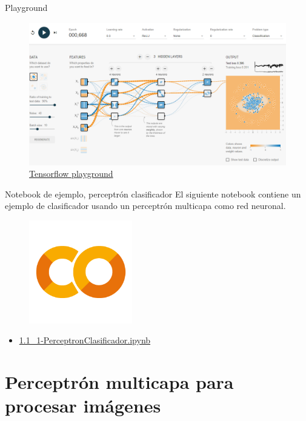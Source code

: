 \begin{frame}{Playground}
\begin{figure}
    \centering
    \includegraphics[width=\textwidth]{Slides/figures/Tema 3/Playground.png}
    \caption{\href{https://playground.tensorflow.org/}{Tensorflow playground}}
\end{figure}
\end{frame}

\begin{frame}{Notebook de ejemplo, perceptrón clasificador}
El siguiente notebook contiene un ejemplo de clasificador usando un perceptrón multicapa como red neuronal.

\begin{figure}
    \centering
    \includegraphics[width=0.4\textwidth]{Slides/figures/GoogleColab.png}
\end{figure}
\begin{itemize}
    \centering
    \item {\Large \href{https://colab.research.google.com/drive/1qzLr3sWe4Nk7LW9Jycb9vq-Offsg1yHL?usp=sharing}{1.1\_1-PerceptronClasificador.ipynb}}
\end{itemize}
\end{frame}

\section{Perceptrón multicapa para procesar imágenes}

